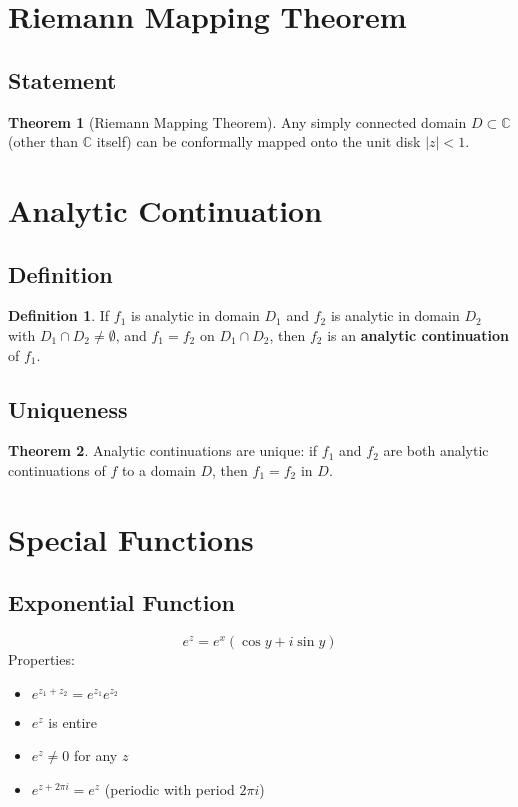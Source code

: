 \documentclass[11pt]{article}
\theoremstyle{definition}
\newtheorem{definition}{Definition}[section]
\newtheorem{theorem}{Theorem}[section]
\begin{document}
\section{Riemann Mapping Theorem}

\subsection{Statement}
\begin{theorem}[Riemann Mapping Theorem]
Any simply connected domain $D \subset \mathbb{C}$ (other than $\mathbb{C}$ itself) can be conformally mapped onto the unit disk $|z| < 1$.
\end{theorem}

\section{Analytic Continuation}

\subsection{Definition}
\begin{definition}
If $f_1$ is analytic in domain $D_1$ and $f_2$ is analytic in domain $D_2$ with $D_1 \cap D_2 \neq \emptyset$, and $f_1 = f_2$ on $D_1 \cap D_2$, then $f_2$ is an \textbf{analytic continuation} of $f_1$.
\end{definition}

\subsection{Uniqueness}
\begin{theorem}
Analytic continuations are unique: if $f_1$ and $f_2$ are both analytic continuations of $f$ to a domain $D$, then $f_1 = f_2$ in $D$.
\end{theorem}

\section{Special Functions}

\subsection{Exponential Function}
$$e^z = e^x (\cos y + i \sin y)$$
Properties:
\begin{itemize}
    \item $e^{z_1 + z_2} = e^{z_1} e^{z_2}$
    \item $e^z$ is entire
    \item $e^z \neq 0$ for any $z$
    \item $e^{z + 2\pi i} = e^z$ (periodic with period $2\pi i$)
\end{itemize}
\end{document}
